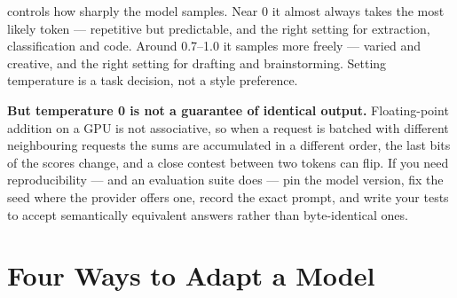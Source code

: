 \begin{conceptbox}[Temperature]
 controls how sharply the model samples. Near 0 it almost always
takes the most likely token --- repetitive but predictable, and the right setting
for extraction, classification and code. Around 0.7--1.0 it samples more freely ---
varied and creative, and the right setting for drafting and brainstorming. Setting
temperature is a task decision, not a style preference.

\textbf{But temperature 0 is not a guarantee of identical output.} Floating-point
addition on a GPU is not associative, so when a request is batched with different
neighbouring requests the sums are accumulated in a different order, the last bits
of the scores change, and a close contest between two tokens can flip. If you need
reproducibility --- and an evaluation suite does --- pin the model version, fix the
seed where the provider offers one, record the exact prompt, and write your tests
to accept semantically equivalent answers rather than byte-identical ones.
\end{conceptbox}

\section{Four Ways to Adapt a Model}

